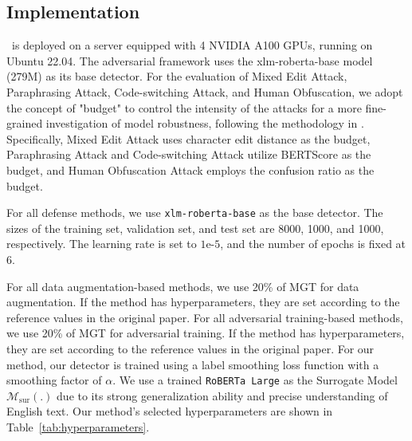 \subsection{Implementation}
\label{appdx:implementation}
\modelname\ is deployed on a server equipped with 4 NVIDIA A100 GPUs, running on Ubuntu 22.04. The adversarial framework uses the xlm-roberta-base model (279M) as its base detector.
For the evaluation of Mixed Edit Attack, Paraphrasing Attack, Code-switching Attack, and Human Obfuscation, we adopt the concept of "budget" to control the intensity of the attacks for a more fine-grained investigation of model robustness, following the methodology in \citet{wang2024stumbling}.
Specifically, Mixed Edit Attack uses character edit distance \cite{levenshtein1966binary} as the budget, Paraphrasing Attack and Code-switching Attack utilize BERTScore \cite{zhang2019bertscore} as the budget, and Human Obfuscation Attack employs the confusion ratio as the budget.

For all defense methods, we use \texttt{xlm-roberta-base} as the base detector. The sizes of the training set, validation set, and test set are 8000, 1000, and 1000, respectively. The learning rate is set to $1\text{e-}5$, and the number of epochs is fixed at 6.

For all data augmentation-based methods, we use 20\% of MGT for data augmentation. If the method has hyperparameters, they are set according to the reference values in the original paper.
For all adversarial training-based methods, we use 20\% of MGT for adversarial training. If the method has hyperparameters, they are set according to the reference values in the original paper.
For our method, our detector is trained using a label smoothing loss function with a smoothing factor of $\alpha$. We use a trained \texttt{RoBERTa Large} as the Surrogate Model $\mathcal{M}_{\text{sur}}(.)$ due to its strong generalization ability and precise understanding of English text.
Our method's selected hyperparameters are shown in Table~\ref{tab:hyperparameters}.

